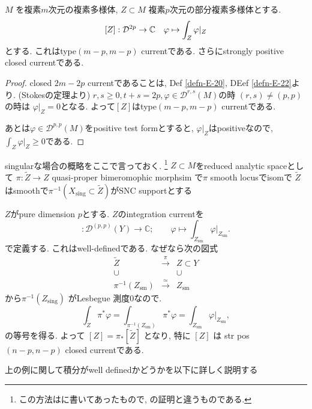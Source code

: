 \begin{ex}
$M$ を複素$m$次元の複素多様体, $Z \subset M$ 複素$p$次元の部分複素多様体とする.
$$
[Z] : \mathcal{D}^{2p} \to \mathbb{C}
\quad \varphi \mapsto \int_{Z}\varphi|_{Z}
$$
とする. これはtype$(m-p, m-p)$ currentである. 
さらにstrongly positive closed currentである. 
\begin{proof}
closed $2m-2p$ currentであることは, Def \ref{defn-E-20}, DEef \ref{defn-E-22}より. 
(Stokesの定理より)
$r, s \ge 0, t+s = 2p, \varphi \in \mathcal{D}^{r,s}(M)$の時
$(r,s) \neq (p,p)$の時は
$\varphi|_{Z} =0$となる. 
よって$[Z]$はtype$(m-p, m-p)$ currentである. 

あとは$\varphi \in \mathcal{D}^{p,p}(M)$をpositive test formとすると, 
$\varphi|_{Z}$はpositiveなので, $\int_{Z}\varphi|_{Z} \ge 0$である. 
\end{proof}

singularな場合の概略をここで言っておく. \footnote{この方法は\cite{NO}に書いてあったもので, \cite{Dem}の証明と違うものである.}
$Z \subset M$をreduced analytic spaceとして
$\pi : \widetilde{Z} \to Z$ quasi-proper
bimeromophic  morphsim で$\pi$ smooth locusでisomで
$\widetilde{Z}$はsmoothで$\pi^{-1}(X_{\mathrm{sing}} \subset \widetilde{Z})$がSNC supportとする

$Z$がpure dimension $p$とする.
$Z$のintegration currentを
\begin{equation*}
[Z]\colon\mathcal{D}^{(p,p)}(Y)\longrightarrow\mathbb{C};
\qquad
\varphi\longmapsto\int_{Z_{\mathrm{sm}}}\varphi|_{Z_{\mathrm{sm}}}.
\end{equation*}
で定義する. 
これはwell-definedである. なぜなら次の図式
\begin{equation*}
\begin{array}{ccc}
\widetilde Z & \xrightarrow{\pi} & Z\subset Y\\
\cup && \cup\\
\pi^{-1}(Z_{\mathrm{sm}}) & \xrightarrow{\simeq} & Z_{\mathrm{sm}}
\end{array}
\end{equation*}
から$\pi^{-1}(Z_{\mathrm{sing}})$ がLesbegue 測度0なので. 
\begin{equation*}
\int_{\widetilde Z}\pi^*\varphi
=
\int_{\pi^{-1}(Z_{\mathrm{sm}})}\pi^*\varphi
=
\int_{Z_{\mathrm{sm}}}\varphi|_{Z_{\mathrm{sm}}},
\end{equation*}
の等号を得る. よって
$[Z]=\pi_*[\widetilde Z]$
となり, 特に $[Z]$ は str pos $(n-p,n-p)$ closed currentである. 
\end{ex}
上の例に関して積分がwell definedかどうかを以下に詳しく説明する

